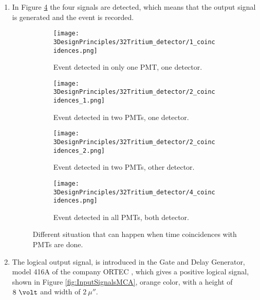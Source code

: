 \begin{enumerate}
\begin{enumerate}
\begin{enumerate}
\item{} In Figure \ref{subfig:signalInAllPMTsBothDetector} the four signals are detected, which means that the output signal is generated and the event is recorded.

\begin{figure}
\centering
    \begin{subfigure}[b]{0.45\textwidth}
    \centering
    \texttt{[image: 3DesignPrinciples/32Tritium\_detector/1\_coincidences.png]}  
    \caption{Event detected in only one PMT, one detector.\label{subfig:signalInOnePMT}}
    \end{subfigure}
    \hfill
    \begin{subfigure}[b]{0.45\textwidth}
    \centering
    \texttt{[image: 3DesignPrinciples/32Tritium\_detector/2\_coincidences\_1.png]}  
    \caption{Event detected in two PMTs, one detector.\label{subfig:signalInTwoPMTOneDetector}}
    \end{subfigure}
    \hfill
    \begin{subfigure}[b]{0.45\textwidth}
    \centering
    \texttt{[image: 3DesignPrinciples/32Tritium\_detector/2\_coincidences\_2.png]}  
    \caption{Event detected in two PMTs, other detector.\label{subfig:signalInTwoPMTOtherDetector}}
    \end{subfigure}
    \hfill
    \begin{subfigure}[b]{0.45\textwidth}
    \centering
    \texttt{[image: 3DesignPrinciples/32Tritium\_detector/4\_coincidences.png]}  
    \caption{Event detected in all PMTs, both detector.\label{subfig:signalInAllPMTsBothDetector}}
    \end{subfigure}
 \caption{Different situation that can happen when time coincidences with PMTs are done.}
 \label{fig:DifferentCoincidences}
\end{figure}

\item{} The logical output signal, is introduced in the Gate and Delay Generator, model 416A of the company ORTEC \cite{DataSheetGateAndDelay}, which gives a positive logical signal, shown in Figure \ref{fig:InputSignalsMCA}, orange color, with a height of $8~\volt$ and width of $2~\mu\second$.

\end{enumerate}

\end{enumerate}

\end{enumerate}

